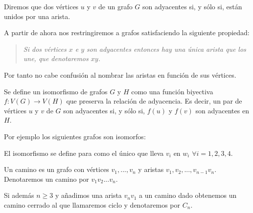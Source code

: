 \begin{definition}
	Diremos que dos vértices $u$ y $v$ de un grafo $G$ son adyacentes si, y sólo si, están unidos por una arista.
\end{definition}

A partir de ahora  nos restringiremos a grafos  satisfaciendo la siguiente propiedad: 
\begin{quote} {\em Si dos vértices $x$ e $y$   son adyacentes entonces hay una única arista que los une, que denotaremos $xy$.}
\end{quote}
Por tanto no cabe confusión al nombrar las aristas en función de sus vértices.

\begin{definition}
	Se define un isomorfismo de grafos $G$ y $H$ como una función biyectiva $f : V(G) \rightarrow V(H)$ que preserva la relación de adyacencia. Es decir, un par de vértices $u$ y $v$ de $G$ son adyacentes si, y sólo si, $f(u)$ y $f(v)$ son adyacentes en $H$.
\end{definition}

Por ejemplo los siguientes grafos son isomorfos:
\[\]
\[\]
	El isomorfismo se define para como el único que lleva $v_{i}$ en $w_{i}$ $\forall i = 1,2,3,4$.

\begin{definition}
Un camino es un grafo con vértices $v_{1},...,v_{n}$ y aristas $v_{1},v_{2},...,v_{n-1}v_{n}$. Denotaremos un camino por $v_{1}v_{2}...v_{n}$.

Si además $n \geq 3$ y añadimos una arista $v_{n}v_{1}$ a un camino dado obtenemos un camino cerrado al que llamaremos ciclo y denotaremos por $C_n$.
\end{definition}

